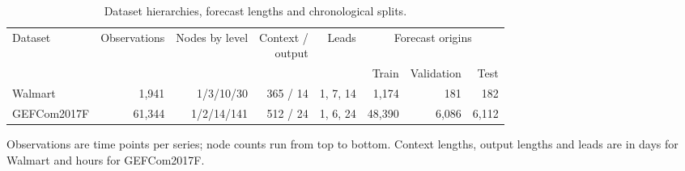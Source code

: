 \begin{table}[!htbp]
\centering
\caption{Dataset hierarchies, forecast lengths and chronological splits.}
\label{tab:data}
\footnotesize
\setlength{\tabcolsep}{3pt}
\begin{tabular*}{\textwidth}{@{\extracolsep{\fill}}lrrrrrrr@{}}
\toprule
Dataset & Observations & Nodes by level & \shortstack{Context /\\output} & Leads & \multicolumn{3}{c}{Forecast origins} \\
\cmidrule(lr){6-8}
& & & & & Train & Validation & Test \\
\midrule
Walmart & 1,941 & 1/3/10/30 & 365 / 14 & 1, 7, 14 & 1,174 & 181 & 182 \\
GEFCom2017F & 61,344 & 1/2/14/141 & 512 / 24 & 1, 6, 24 & 48,390 & 6,086 & 6,112 \\
\bottomrule
\end{tabular*}
\par\smallskip\begin{minipage}{\textwidth}\footnotesize Observations are time points per series; node counts run from top to bottom. Context lengths, output lengths and leads are in days for Walmart and hours for GEFCom2017F.\end{minipage}
\end{table}
